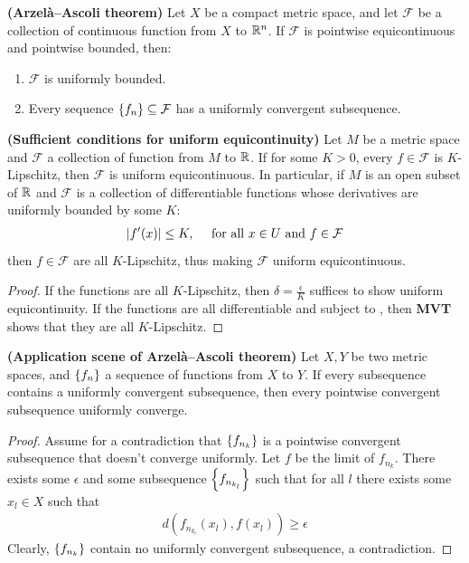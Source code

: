 \documentclass{report}
\begin{document}
\begin{theorem}
\label{THaat}
\textbf{(Arzelà–Ascoli theorem)} Let $X$ be a compact metric space, and let $\mathcal{F}$ be a collection of continuous function from $X$ to $\mathbb{R}^n$. If $\mathcal{F}$ is pointwise equicontinuous and pointwise bounded, then:  
\begin{enumerate}[label=(\Roman*)]
  \item $\mathcal{F}$ is uniformly bounded. 
  \item  Every sequence  $\left\{ f_n \right\} \subseteq \mathcal{F}$ has a uniformly convergent subsequence.  
\end{enumerate}
\end{theorem}
\begin{theorem}
\label{THscfue}
\textbf{(Sufficient conditions for uniform equicontinuity)} Let $M$ be a metric space and  $\mathcal{F}$ a collection of function from $M$ to $\mathbb{R}$. If  for some $K>0$, every $f \in \mathcal{F}$ is $K$-Lipschitz, then $\mathcal{F}$ is uniform equicontinuous. In particular, if $M$ is an open subset of $\mathbb{R}$ and  $\mathcal{F}$ is a collection of differentiable functions whose derivatives are uniformly bounded by some $K$:  
\begin{align}
\label{EQf'xk}
\left|f'(x)\right| \leq K,\quad \text{ for all }x\in U\text{ and }f \in \mathcal{F} 
\end{align}
then $f\in \mathcal{F}$ are all $K$-Lipschitz, thus making $\mathcal{F}$ uniform equicontinuous. 
\end{theorem}
\begin{proof}
If the functions are all $K$-Lipschitz, then  $\delta =\frac{\epsilon}{K}$ suffices to show uniform equicontinuity. If the functions are all differentiable and subject to , then \textbf{MVT} shows that they are all $K$-Lipschitz.  
\end{proof}
\begin{theorem}
\label{THasoaat}
\textbf{(Application scene of Arzelà–Ascoli theorem)} Let $X,Y$ be two metric spaces, and $\left\{ f_n \right\}$ a sequence of functions from $X$ to $Y$. If every subsequence contains a uniformly convergent subsequence, then every pointwise convergent subsequence uniformly converge.  
\end{theorem}
\begin{proof}
Assume for a contradiction that $\left\{ f_{n_k} \right\}$ is a pointwise convergent subsequence that doesn't converge uniformly. Let $f$ be the limit of $f_{n_k}$.  There exists some $\epsilon $ and some subsequence $\left\{ f_{n_{k_l}} \right\}$ such that for all $l$ there exists some  $x_l \in X$ such that 
\begin{align*}
d\left(f_{n_{k_l}}(x_l),f(x_l) \right) \geq \epsilon 
\end{align*}
Clearly, $\left\{ f_{n_k} \right\}$ contain no uniformly convergent subsequence, a contradiction. 
\end{proof}
\end{document}

